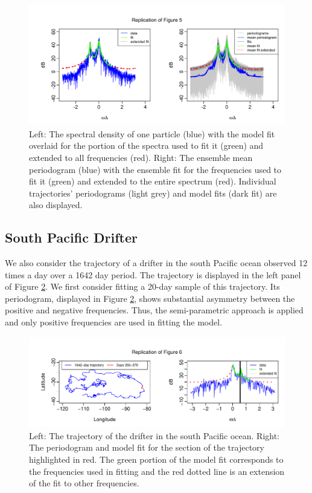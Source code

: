 \documentclass{stat572Style}
\begin{document}
\begin{figure}[h!]
  \centering
    \includegraphics[width=\textwidth]{ReplicatedFigures/fig5.png}
        \caption{Left: The spectral density of one particle (blue) with the model fit overlaid for the portion of the spectra used to fit it (green) and extended to all frequencies (red). Right: The ensemble mean periodogram (blue) with the ensemble fit for the frequencies used to fit it (green) and extended to the entire spectrum (red). Individual trajectories' periodograms (light grey) and model fits (dark fit) are also displayed. }
        \label{fig: fig5}
\end{figure}

\subsection{South Pacific Drifter}
\label{sec: spDrift}
We also consider the trajectory of a drifter in the south Pacific ocean observed 12 times a day over a 1642 day period.  
The trajectory is displayed in the left panel of Figure \ref{fig: fig6}. 
We first consider fitting a 20-day sample of this trajectory. 
Its periodogram, displayed in Figure \ref{fig: fig6}, shows substantial asymmetry between the positive and negative frequencies. Thus, the semi-parametric approach is applied and only positive frequencies are used in fitting the model. 

\begin{figure}[h!]
  \centering
    \includegraphics[width=\textwidth]{ReplicatedFigures/fig6.pdf}
        \caption{Left: The trajectory of the drifter in the south Pacific ocean. Right: The periodogram and model fit for the section of the trajectory highlighted in red. The green portion of the model fit corresponds to the frequencies used in fitting and the red dotted line is an extension of the fit to other frequencies. }
        \label{fig: fig6}
\end{figure}
\end{document}

